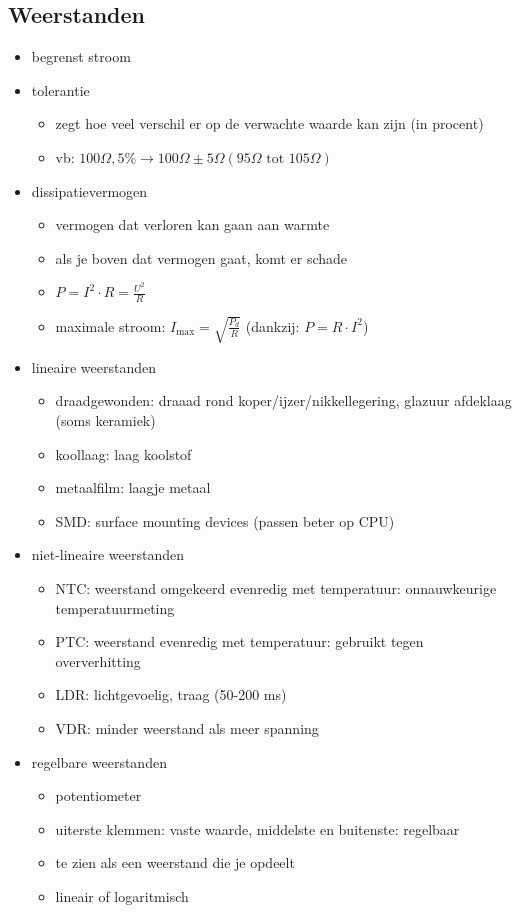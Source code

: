 \documentclass[11pt]{article}
\let\originalitem\item
\renewcommand{\item}{\originalitem[]}
\newcommand{\Newpage}{\end{preview}\begin{preview}}
\begin{document}
\begin{preview}
\Newpage
\section{Weerstanden}

\begin{itemize}
	\item begrenst stroom
	\item tolerantie
	\begin{itemize}
		\item zegt hoe veel verschil er op de verwachte waarde kan zijn (in procent)
		\item vb: $100 \Omega, 5\% \rightarrow 100 \Omega \pm 5 \Omega (95 \Omega \textrm{ tot } 105 \Omega)$
	\end{itemize}
	\item dissipatievermogen
	\begin{itemize}
		\item vermogen dat verloren kan gaan aan warmte
		\item als je boven dat vermogen gaat, komt er schade
		\item $P = I^2 \cdot R = \frac{U^2}{R}$
		\item maximale stroom: $I_{\textrm{max}} = \sqrt{\frac{P_d}{R}}$ (dankzij: $P=R \cdot I^2$)
	\end{itemize}
	\item lineaire weerstanden
	\begin{itemize}
		\item draadgewonden: draaad rond koper/ijzer/nikkellegering, glazuur afdeklaag (soms keramiek)
		\item koollaag: laag koolstof
		\item metaalfilm: laagje metaal
		\item SMD: surface mounting devices (passen beter op CPU)
	\end{itemize}
	\item niet-lineaire weerstanden
	\begin{itemize}
		\item NTC: weerstand omgekeerd evenredig met temperatuur: onnauwkeurige temperatuurmeting
		\item PTC: weerstand evenredig met temperatuur: gebruikt tegen oververhitting
		\item LDR: lichtgevoelig, traag (50-200 ms)
		\item VDR: minder weerstand als meer spanning
	\end{itemize}
	\item regelbare weerstanden
	\begin{itemize}
		\item potentiometer
		\item uiterste klemmen: vaste waarde, middelste en buitenste: regelbaar
		\item te zien als een weerstand die je opdeelt
		\item lineair of logaritmisch
	\end{itemize}
\end{itemize}


\end{preview}
\end{document}
